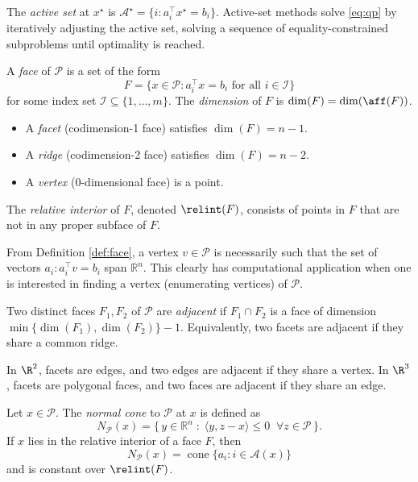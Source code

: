 The \emph{active set} at $x^\star$ is $\mathcal{A}^\star = \{i : a_i^\top x^\star = b_i\}$. Active-set methods solve \eqref{eq:qp} by iteratively adjusting the active set, solving a sequence of equality-constrained subproblems until optimality is reached.


\begin{definition}\label{def:face}
A \emph{face} of $\mathcal{P}$ is a set of the form
\begin{equation}
F = \{x \in \mathcal{P} : a_i^\top x = b_i \text{ for all } i \in \mathcal{I}\}
\end{equation}
for some index set $\mathcal{I} \subseteq \{1,\ldots,m\}$. The \emph{dimension} of $F$ is $\dim(F) = \dim(\aff(F))$. 
\begin{itemize}
    \item A \emph{facet} (codimension-1 face) satisfies $\dim(F) = n-1$.
    \item A \emph{ridge} (codimension-2 face) satisfies $\dim(F) = n-2$.
    \item A \emph{vertex} (0-dimensional face) is a point.
\end{itemize}
The \emph{relative interior} of $F$, denoted $\relint(F)$, consists of points in $F$ that are not in any proper subface of $F$.
\end{definition}

\begin{remark}\label{rem:vertex}
    From Definition \ref{def:face}, a vertex $v \in \mathcal{P}$ is necessarily such that the set of vectors $a_i : a_i^\top v = b_i$ span $\mathbb{R}^n$. This clearly has computational application when one is interested in finding a vertex (enumerating vertices) of $\mathcal{P}$.
\end{remark}

\begin{definition}\label{def:adjacent}
Two distinct faces $F_1, F_2$ of $\mathcal{P}$ are \emph{adjacent} if $F_1 \cap F_2$ is a face of dimension $\min\{\dim(F_1), \dim(F_2)\} - 1$. Equivalently, two facets are adjacent if they share a common ridge.
\end{definition}

\begin{example}\label{ex:adjacency}
In $\R^2$, facets are edges, and two edges are adjacent if they share a vertex. In $\R^3$, facets are polygonal faces, and two faces are adjacent if they share an edge. 
\end{example}

\begin{definition}\label{def:normal_cone}
Let $x \in \mathcal{P}$.  
The \emph{normal cone} to $\mathcal{P}$ at $x$ is defined as
\begin{equation}
N_{\mathcal{P}}(x)
=
\{\, y \in \mathbb{R}^n \;:\; \langle y, z - x \rangle \le 0 \;\; \forall z \in \mathcal{P} \,\}.
\end{equation}
If $x$ lies in the relative interior of a face $F$, then 
\begin{equation}
N_{\mathcal{P}}(x) = \operatorname{cone}\{ a_i : i \in \mathcal{A}(x) \}
\end{equation}
and is constant over $\relint(F)$.
\end{definition}

